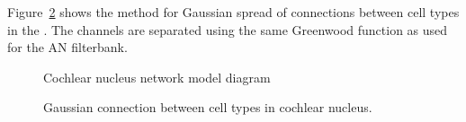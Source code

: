 Figure~\ref{fig:CNconn} shows the method for Gaussian spread of
connections between cell types in the \CN.  The channels are separated
using the same Greenwood function as used for the AN filterbank.

\begin{figure}[htb]
  \begin{center}
    \caption{Cochlear nucleus network model diagram \label{fig:CNdiagram}}
  \end{center}
\end{figure}



\begin{figure}[htb]
  \begin{center}
    \caption{Gaussian connection between cell types in cochlear
      nucleus.}
    \label{fig:CNconn}
  \end{center}
\end{figure}







